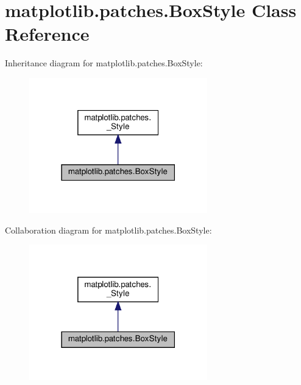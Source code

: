 \hypertarget{classmatplotlib_1_1patches_1_1BoxStyle}{}\section{matplotlib.\+patches.\+Box\+Style Class Reference}
\label{classmatplotlib_1_1patches_1_1BoxStyle}


Inheritance diagram for matplotlib.\+patches.\+Box\+Style\+:
\nopagebreak
\begin{figure}[H]
\begin{center}
\leavevmode
\includegraphics[width=219pt]{classmatplotlib_1_1patches_1_1BoxStyle__inherit__graph}
\end{center}
\end{figure}


Collaboration diagram for matplotlib.\+patches.\+Box\+Style\+:
\nopagebreak
\begin{figure}[H]
\begin{center}
\leavevmode
\includegraphics[width=219pt]{classmatplotlib_1_1patches_1_1BoxStyle__coll__graph}
\end{center}
\end{figure}
